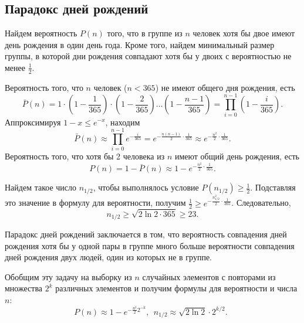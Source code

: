 \subsection{Парадокс дней рождений}

Найдем вероятность $P(n)$ того, что в группе из $n$ человек хотя бы двое имеют день рождения в один день года. Кроме того, найдем минимальный размер группы, в которой дни рождения совпадают хотя бы у двоих с вероятностью не менее $\frac{1}{2}$.

Вероятность того, что $n$ человек ($n < 365$) не имеют общего дня рождения, есть
\[
    \bar{P}(n) = 1 \cdot \left( 1 - \frac{1}{365} \right) \cdot \left(1 - \frac{2}{365} \right)  \dots  \left( 1 - \frac{n-1}{365} \right) = \prod\limits_{i=0}^{n-1} \left( 1 - \frac{i}{365} \right).
\]
Аппроксимируя $1-x \leq e^{-x}$, находим
    \[ \bar{P}(n) \approx \prod\limits_{i=0}^{n-1} e^{-\frac{i}{365}} = e^{-\frac{n(n-1)}{2} \cdot \frac{1}{365}} \approx e^{-\frac{n^2}{2} \cdot \frac{1}{365}}. \]
Вероятность того, что хотя бы 2 человека из $n$ имеют общий день рождения, есть
    \[ P(n) = 1 - \bar{P}(n) \approx 1 -  e^{-\frac{n^2}{2} \cdot \frac{1}{365}}. \]

Найдем такое число $n_{1/2}$, чтобы выполнялось условие $P(n_{1/2}) \geq \frac{1}{2}$. Подставляя это значение в формулу для вероятности, получим $\frac{1}{2} \geq e^{-\frac{n_{1/2}^2}{2} \cdot \frac{1}{365}}$. Следовательно,
\[
    n_{1/2} \geq \sqrt{2 \ln 2 \cdot 365} \geq 23.
\]

Парадокс дней рождений заключается в том, что вероятность совпадения дней рождения хотя бы у одной пары в группе много больше вероятности совпадения дней рождения двух людей, один из которых не в группе.


Обобщим эту задачу на выборку из $n$ случайных элементов с повторами из множества  $2^k$ различных элементов и получим формулы для вероятности и числа $n$:
\[
    P(n) \approx 1 -  e^{-\frac{n^2}{2} 2^{-k}}, ~~
    n_{1/2} \approx \sqrt{2 \ln 2} \cdot 2^{k/2}. ~~
\]
